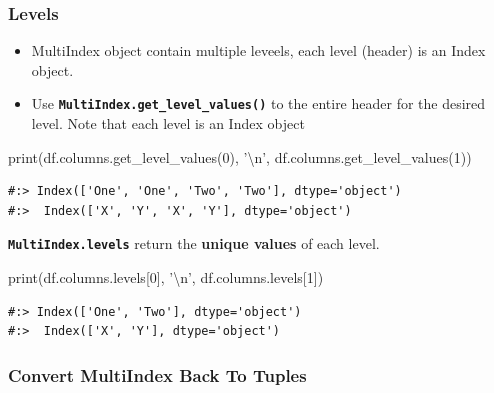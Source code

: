 \documentclass[
]{book}
\newenvironment{Shaded}{\begin{snugshade}}{\end{snugshade}}
\newcommand{\BuiltInTok}[1]{#1}
\newcommand{\CharTok}[1]{\textcolor[rgb]{0.5,0.5,0.5}{#1}}
\newcommand{\DecValTok}[1]{\textcolor[rgb]{0.06,0.06,0.06}{#1}}
\newcommand{\NormalTok}[1]{#1}
\newcommand{\StringTok}[1]{\textcolor[rgb]{0.5,0.5,0.5}{#1}}
\providecommand{\tightlist}{%
  \setlength{\itemsep}{0pt}\setlength{\parskip}{0pt}}
\begin{document}
\hypertarget{levels}{%
\subsubsection{Levels}\label{levels}}

\begin{itemize}
\tightlist
\item
  MultiIndex object contain multiple leveels, each level (header) is an Index object.\\
\item
  Use \textbf{\texttt{MultiIndex.get\_level\_values()}} to the entire header for the desired level. Note that each level is an Index object
\end{itemize}

\begin{Shaded}
\begin{Highlighting}[]
\BuiltInTok{print}\NormalTok{(df.columns.get_level_values(}\DecValTok{0}\NormalTok{), }\StringTok{'}\CharTok{\textbackslash{}n}\StringTok{'}\NormalTok{,}
\NormalTok{      df.columns.get_level_values(}\DecValTok{1}\NormalTok{))}
\end{Highlighting}
\end{Shaded}

\begin{verbatim}
#:> Index(['One', 'One', 'Two', 'Two'], dtype='object') 
#:>  Index(['X', 'Y', 'X', 'Y'], dtype='object')
\end{verbatim}

\textbf{\texttt{MultiIndex.levels}} return the \textbf{unique values} of each level.

\begin{Shaded}
\begin{Highlighting}[]
\BuiltInTok{print}\NormalTok{(df.columns.levels[}\DecValTok{0}\NormalTok{], }\StringTok{'}\CharTok{\textbackslash{}n}\StringTok{'}\NormalTok{,}
\NormalTok{      df.columns.levels[}\DecValTok{1}\NormalTok{])}
\end{Highlighting}
\end{Shaded}

\begin{verbatim}
#:> Index(['One', 'Two'], dtype='object') 
#:>  Index(['X', 'Y'], dtype='object')
\end{verbatim}

\hypertarget{convert-multiindex-back-to-tuples}{%
\subsubsection{Convert MultiIndex Back To Tuples}\label{convert-multiindex-back-to-tuples}}
\end{document}
